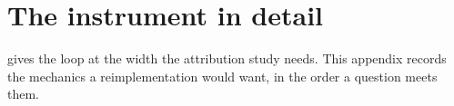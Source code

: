 %
%
%

\section{The instrument in detail}\label{app:instrument}

 gives the loop at the width the attribution study
needs. This appendix records the mechanics a reimplementation would
want, in the order a question meets them.

